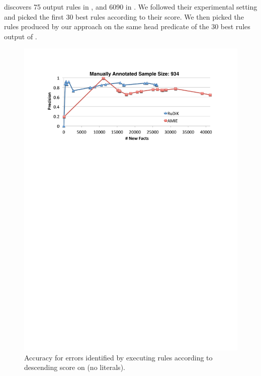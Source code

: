 \amie discovers 
75 output rules in \yago, and 6090 in \dbpedia. We followed their experimental setting and picked the first 30 best rules according to their score. We then picked the rules produced by our approach on the same head predicate of the 30 best rules output of \amie. 

\begin{figure}[ht]
	\centering
	\includegraphics[width=.9\columnwidth]{include/figure/vsAmieDBPedia.pdf}
	\vspace{-2ex}
	\caption{Accuracy for errors identified by executing rules according to descending score on \dbpedia (no literals).}
	\label{fig:vs_amie_dbpedia}
\end{figure}

